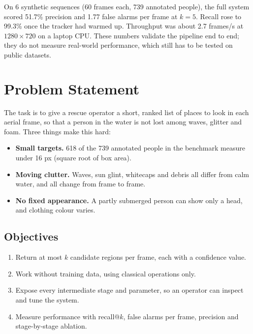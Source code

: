 \documentclass[11pt,a4paper]{article}
\begin{document}
On 6 synthetic sequences (60 frames each, 739 annotated people), the full system scored 51.7\% precision and 1.77 false alarms per frame at $k = 5$. Recall rose to 99.3\% once the tracker had warmed up. Throughput was about 2.7 frames/s at $1280 \times 720$ on a laptop CPU. These numbers validate the pipeline end to end; they do not measure real-world performance, which still has to be tested on public datasets.

\clearpage
\tableofcontents
\clearpage

\section{Problem Statement}

The task is to give a rescue operator a short, ranked list of places to look in each aerial frame, so that a person in the water is not lost among waves, glitter and foam. Three things make this hard:

\begin{itemize}
  \item \textbf{Small targets.} 618 of the 739 annotated people in the benchmark measure under 16 px (square root of box area).
  \item \textbf{Moving clutter.} Waves, sun glint, whitecaps and debris all differ from calm water, and all change from frame to frame.
  \item \textbf{No fixed appearance.} A partly submerged person can show only a head, and clothing colour varies.
\end{itemize}

\subsection{Objectives}

\begin{enumerate}
  \item Return at most $k$ candidate regions per frame, each with a confidence value.
  \item Work without training data, using classical operations only.
  \item Expose every intermediate stage and parameter, so an operator can inspect and tune the system.
  \item Measure performance with recall@$k$, false alarms per frame, precision and stage-by-stage ablation.
\end{enumerate}
\end{document}
